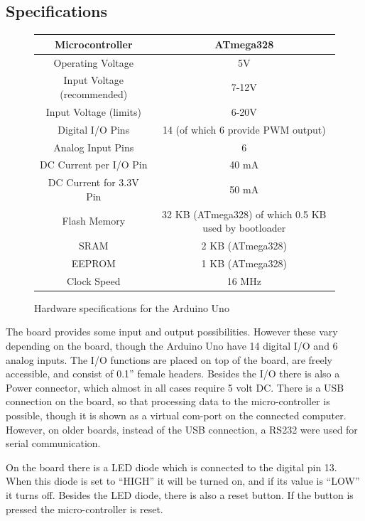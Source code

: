 \subsection*{Specifications}
\begin{figure}[hbtp]
\centering
\begin{tabular}{|c|c|}
\hline 
Microcontroller & ATmega328 \\ 
\hline 
Operating Voltage & 5V \\ 
\hline 
Input Voltage (recommended)	 & 7-12V \\ 
\hline 
Input Voltage (limits) & 6-20V \\ 
\hline 
Digital I/O Pins & 14 (of which 6 provide PWM output) \\ 
\hline 
Analog Input Pins & 6 \\ 
\hline 
DC Current per I/O Pin & 40 mA \\ 
\hline 
DC Current for 3.3V Pin & 50 mA \\ 
\hline 
Flash Memory & 32 KB (ATmega328) of which 0.5 KB used by bootloader \\ 
\hline 
SRAM & 2 KB (ATmega328) \\ 
\hline 
EEPROM & 1 KB (ATmega328) \\ 
\hline 
Clock Speed & 16 MHz \\ 
\hline 
\end{tabular} 
\caption{Hardware specifications for the Arduino Uno}
\end{figure}


The board provides some input and output possibilities. However these vary depending on the board, though the Arduino Uno have 14 digital I/O and 6 analog inputs. The I/O functions are placed on top of the board, are freely accessible, and consist of 0.1'' female headers. Besides the I/O there is also a Power connector, which almost in all cases require 5 volt DC. There is a USB connection on the board, so that processing data to the micro-controller is possible, though it is shown as a virtual com-port on the connected computer. However, on older boards, instead of the USB connection, a RS232 were used for serial communication. 

On the board there is a LED diode which is connected to the digital pin 13. When this diode is set to ``HIGH'' it will be turned on, and if its value is ``LOW'' it turns off. Besides the LED diode, there is also a reset button. If the button is pressed the micro-controller is reset. \\

